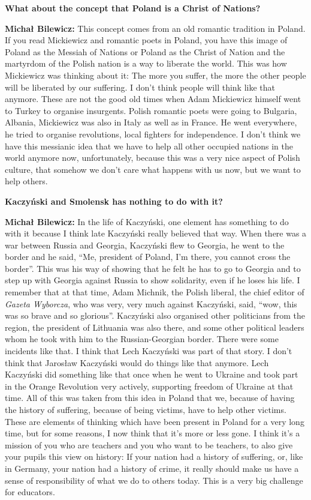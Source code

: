 \textbf{What about the concept that Poland is a Christ of Nations?}

\textbf{Michał Bilewicz:} This concept comes from an old romantic tradition in Poland. If you read Mickiewicz and romantic poets in Poland, you have this image of Poland as the Messiah of Nations or Poland as the Christ of Nation and the martyrdom of the Polish nation is a way to liberate the world. This was how Mickiewicz was thinking about it: The more you suffer, the more the other people will be liberated by our suffering. I don’t think people will think like that anymore. These are not the good old times when Adam Mickiewicz himself went to Turkey to organise insurgents. Polish romantic poets were going to Bulgaria, Albania, Mickiewicz was also in Italy as well as in France. He went everywhere, he tried to organise revolutions, local fighters for independence. I don’t think we have this messianic idea that we have to help all other occupied nations in the world anymore now, unfortunately, because this was a very nice aspect of Polish culture, that somehow we don’t care what happens with us now, but we want to help others.

\textbf{Kaczyński and Smolensk has nothing to do with it?}

\textbf{Michał Bilewicz:} In the life of Kaczyński, one element has something to do with it because I think late Kaczyński really believed that way. When there was a war between Russia and Georgia, Kaczyński flew to Georgia, he went to the border and he said, ``Me, president of Poland, I’m there, you cannot cross the border''. This was his way of showing that he felt he has to go to Georgia and to step up with Georgia against Russia to show solidarity, even if he loses his life. I remember that at that time, Adam Michnik, the Polish liberal, the chief editor of \textit{Gazeta Wyborcza}, who was very, very much against Kaczyński, said, ``wow, this was so brave and so glorious''. Kaczyński also organised other politicians from the region, the president of Lithuania was also there, and some other political leaders whom he took with him to the Russian-Georgian border. There were some incidents like that. I think that Lech Kaczyński was part of that story. I don’t think that Jarosław Kaczyński would do things like that anymore. Lech Kaczyński did something like that once when he went to Ukraine and took part in the Orange Revolution very actively, supporting freedom of Ukraine at that time. All of this was taken from this idea in Poland that we, because of having the history of suffering, because of being victims, have to help other victims. These are elements of thinking which have been present in Poland for a very long time, but for some reasons, I now think that it’s more or less gone. I think it’s a mission of you who are teachers and you who want to be teachers, to also give your pupils this view on history: If your nation had a history of suffering, or, like in Germany, your nation had a history of crime, it really should make us have a sense of responsibility of what we do to others today. This is a very big challenge for educators.
